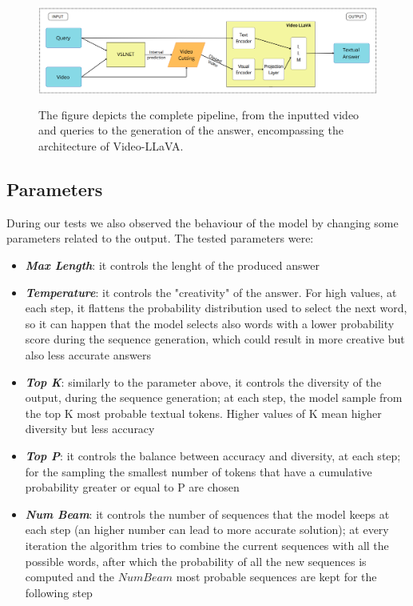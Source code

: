 \documentclass[10pt,twocolumn,letterpaper]{article}
\begin{document}
\begin{figure}
  \includegraphics[width=\textwidth,height=3.5cm]{FinalProposedPipeline.png}
  \caption{The figure depicts the complete pipeline, from the inputted video and queries to the generation of the answer, encompassing the architecture of Video-LLaVA.}
  \label{fig:fullPipeline}
\end{figure}

\subsection{Parameters}
\label{subsec:Parameters}
During our tests we also observed the behaviour of the model by changing some parameters related to the output. The tested parameters were:

\begin{itemize}
\setlength{\parskip}{0.05cm} 
    \item \textit{\textbf{Max Length}}: it controls the lenght of the produced answer
    \item \textit{\textbf{Temperature}}: it controls the "creativity" of the answer. For high values, at each step, it flattens the probability distribution used to select the next word, so it can happen that the model selects also words with a lower probability score during the sequence generation, which could result in more creative but also less accurate answers
    \item \textit{\textbf{Top K}}: similarly to the parameter above, it controls the diversity of the output, during the sequence generation; at each step, the model sample from the top K most probable textual tokens. Higher values of K mean higher diversity but less accuracy
    \item \textit{\textbf{Top P}}: it controls the balance between accuracy and diversity, at each step; for the sampling  the smallest number of tokens that have a cumulative probability greater or equal to P are chosen
     \item \textit{\textbf{Num Beam}}: it controls the number of sequences that the model keeps at each step (an higher number can lead to more accurate solution); at every iteration the algorithm tries to combine the current sequences with all the possible words, after which the probability of all the new sequences is computed and the $Num Beam$ most probable sequences are kept for the following step
    
\end{itemize}
\end{document}
